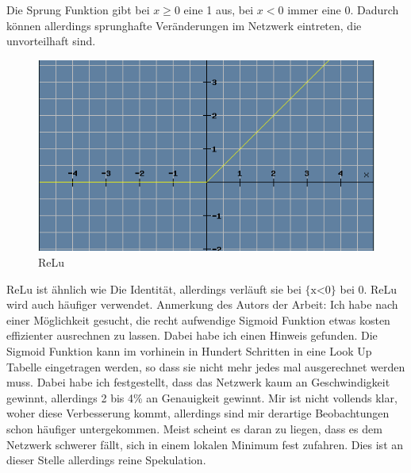 \documentclass[12pt]{article}
\begin{document}
Die Sprung Funktion gibt bei $x \ge 0$ eine 1 aus, bei $x<0$ immer eine 0.
Dadurch können allerdings sprunghafte Veränderungen im Netzwerk eintreten, die unvorteilhaft sind.
\begin{figure}[H]
\centering
\includegraphics[scale=0.60]{./Images/Pasted image 20230912200758.png}
\caption{ReLu}
\label{ReLu}
\end{figure}
ReLu ist ähnlich wie Die Identität, allerdings verläuft sie bei $\text{\{x<0\}}$ bei 0.
ReLu wird auch häufiger verwendet. Anmerkung des Autors der Arbeit: Ich habe nach einer Möglichkeit gesucht, die recht aufwendige Sigmoid Funktion etwas kosten effizienter ausrechnen zu lassen. Dabei habe ich einen Hinweis gefunden. Die Sigmoid Funktion kann im vorhinein in Hundert Schritten in eine Look Up Tabelle eingetragen werden, so dass sie nicht mehr jedes mal ausgerechnet werden muss. Dabei habe ich festgestellt, dass das Netzwerk kaum an Geschwindigkeit gewinnt, allerdings 2 bis 4\% an Genauigkeit gewinnt. Mir ist nicht vollends klar, woher diese Verbesserung kommt, allerdings sind mir derartige Beobachtungen schon häufiger untergekommen. Meist scheint es daran zu liegen, dass es dem Netzwerk schwerer fällt, sich in einem lokalen Minimum fest zufahren. Dies ist an dieser Stelle allerdings reine Spekulation.
\end{document}
